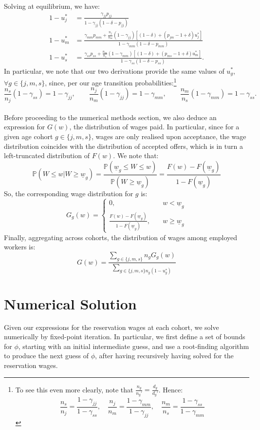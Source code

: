 \documentclass{article}
\newcommand{\lbar}[1]{\underline{#1}} %
\begin{document}
Solving at equilibrium, we have:
\begin{align*}
1-u_j^*
&=
\frac{\gamma_{jj}p_{jj}}
{1-\gamma_{jj}(1-\delta-p_{jj})}\\
1-u_m^*
&=
\frac{
\gamma_{mm}p_{mm}
+\frac{n_j}{n_m}(1-\gamma_{jj})\left[(1-\delta)+(p_{jm}-1+\delta)u_j^*\right]
}
{1-\gamma_{mm}(1-\delta-p_{mm})}\\
1-u_s^*
&=
\frac{
\gamma_{ss}p_{ss}
+\frac{n_m}{n_s}(1-\gamma_{mm})\left[(1-\delta)+(p_{ms}-1+\delta)u_m^*\right]
}
{1-\gamma_{ss}(1-\delta-p_{ss})}.
\end{align*}
In particular, we note that our two derivations provide the same values of $u^*_g$, $\forall g\in\{j,m,s\}$, since, per our age transition probabilities:\footnote{To see this even more clearly, note that $\frac{n_g}{n_g'}=\frac{d_g}{d_g'}$. Hence:
\[
    \frac{n_s}{n_j}=\frac{1-\gamma_{jj}}{1-\gamma_{ss}},\quad
    \frac{n_j}{n_m}=\frac{1-\gamma_{mm}}{1-\gamma_{jj}},\quad
    \frac{n_m}{n_s}=\frac{1-\gamma_{ss}}{1-\gamma_{mm}}
\]
}
\[
\frac{n_s}{n_j}(1-\gamma_{ss})
=
1-\gamma_{jj},
\qquad
\frac{n_j}{n_m}(1-\gamma_{jj})
=
1-\gamma_{mm},
\qquad
\frac{n_m}{n_s}(1-\gamma_{mm})
=
1-\gamma_{ss}.
\]
\medskip\\
\noindent Before proceeding to the numerical methods section, we also deduce an expression for $G(w)$, the distribution of wages paid. In particular, since for a given age cohort $g\in\{j,m,s\}$, wages are only realised upon acceptance, the wage distribution coincides with the distribution of accepted offers, which is in turn a left-truncated distribution of $F(w)$. We note that:
\[
\mathbb{P}(W\leq w| W \geq \lbar{w}_g)=\frac{\mathbb{P}(\lbar{w}_g\leq W\leq w)}{\mathbb{P}(W\geq \lbar{w}_g)}=\frac{F(w)-F(\lbar{w}_g)}{1-F(\lbar{w}_g)}
\]
So, the corresponding wage distribution for $g$ is:
\[
G_g(w)=
\begin{cases}
    0,\quad &w<\lbar{w}_g\\
    \frac{F(w)-F(\lbar{w}_g)}{1-F(\lbar{w}_g)},
    \quad &w\geq\lbar{w}_g
\end{cases}
\]
Finally, aggregating across cohorts, the distribution of wages among employed workers is:
\[
G(w)=\frac{\sum_{g\in\{j,m,s\}} n_gG_g(w)}{\sum_{g\in\{j,m,s\} n_g(1-u_g^*)}}
\]
\section{Numerical Solution}
Given our expressions for the reservation wages at each cohort, we solve numerically by fixed-point iteration. In particular, we first define a set of bounds for $\phi$, starting with an initial intermediate guess, and use a root-finding algorithm to produce the next guess of $\phi$, after having recursively having solved for the reservation wages.
\end{document}
